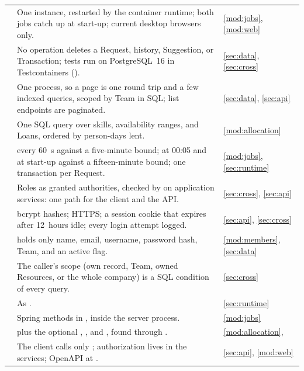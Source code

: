 {\begin{longtable}{@{}L{2.3cm}L{\dimexpr\textwidth-4.7cm-4\tabcolsep\relax}L{2.4cm}@{}}
 & One instance, restarted by the container runtime; both jobs catch up at start-up; current desktop browsers only. & \ref{mod:jobs}, \ref{mod:web} \\
 & No operation deletes a Request, history, Suggestion, or Transaction; tests run on PostgreSQL~16 in Testcontainers (). & \ref{sec:data}, \ref{sec:cross} \\
 & One process, so a page is one round trip and a few indexed queries, scoped by Team in SQL; list endpoints are paginated. & \ref{sec:data}, \ref{sec:api} \\
 & One SQL query over skills, availability ranges, and Loans, ordered by person-days lent. & \ref{mod:allocation} \\
 &  every 60~s against a five-minute bound;  at 00:05 and at start-up against a fifteen-minute bound; one transaction per Request. & \ref{mod:jobs}, \ref{sec:runtime} \\
 & Roles as granted authorities, checked by  on application services: one path for the client and the API. & \ref{sec:cross}, \ref{sec:api} \\
 & bcrypt hashes; HTTPS; a session cookie that expires after 12~hours idle; every login attempt logged. & \ref{sec:api}, \ref{sec:cross} \\
 &  holds only name, email, username, password hash, Team, and an active flag. & \ref{mod:members}, \ref{sec:data} \\
 & The caller's scope (own record, Team, owned Resources, or the whole company) is a SQL condition of every query. & \ref{sec:cross} \\
 & As . & \ref{sec:runtime} \\
 & Spring  methods in , inside the server process. & \ref{mod:jobs} \\
 &  plus the optional , , and , found through . & \ref{mod:allocation},  \\
 & The client calls only ; authorization lives in the services; OpenAPI at . & \ref{sec:api}, \ref{mod:web} \\
\end{longtable}
}

